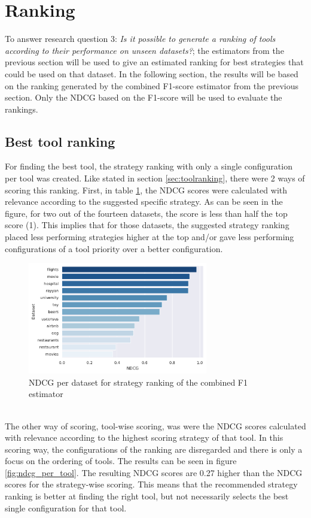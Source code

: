 \section{Ranking}
To answer research question 3: \textit{Is it possible to generate a ranking of tools according to their performance on unseen datasets?}; the estimators from the previous section will be used to give an estimated ranking for best strategies that could be used on that dataset. In the following section, the results will be based on the ranking generated by the combined F1-score estimator from the previous section. Only the NDCG based on the F1-score will be used to evaluate the rankings.

\subsection{Best tool ranking} 
For finding the best tool, the strategy ranking with only a single configuration per tool was created. Like stated in section \ref{sec:toolranking}, there were 2 ways of scoring this ranking. First, in table \ref{fig:ndcg_per_strategy}, the NDCG scores were calculated with relevance according to the suggested specific strategy. As can be seen in the figure, for two out of the fourteen datasets, the score is less than half the top score (1). This implies that for those datasets, the suggested strategy ranking placed less performing strategies higher at the top and/or gave less performing configurations of a tool priority over a better configuration. 

\begin{figure}
    \centering
    \includegraphics[width=0.7\textwidth]{thesis/Figures/RQ3/15_ranking_ndcg_combined_f1.pdf}
    \caption{NDCG per dataset for strategy ranking of the combined F1 estimator}
    \label{fig:ndcg_per_strategy}
\end{figure}

~\\The other way of scoring, tool-wise scoring, was were the NDCG scores calculated with relevance according to the highest scoring strategy of that tool. In this scoring way, the configurations of the ranking are disregarded and there is only a focus on the ordering of tools. The results can be seen in figure \ref{fig:ndcg_per_tool}. The resulting NDCG scores are 0.27 higher than the NDCG scores for the strategy-wise scoring. This means that the recommended strategy ranking is better at finding the right tool, but not necessarily selects the best single configuration for that tool. 

